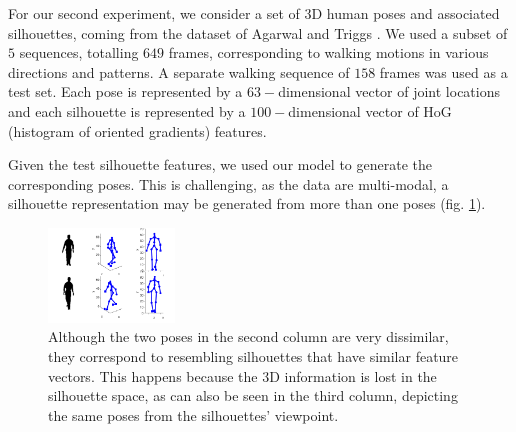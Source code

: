 


For our second experiment, we consider a set of $3$D human poses and
associated silhouettes, coming from the dataset of Agarwal and Triggs
\cite{Agarwal:pose06}. We used a subset of $5$ sequences, totalling
$649$ frames, corresponding to walking motions in various directions
and patterns.  A separate walking sequence of $158$ frames was used as
a test set.  Each pose is represented by a $63-$dimensional vector of
joint locations and each silhouette is represented by a
$100-$dimensional vector of HoG (histogram of oriented gradients) features.

\par Given the test silhouette features, we used our model to generate
the corresponding poses. This is challenging, as the data
are multi-modal, \ie a silhouette representation may be generated from
more than one poses (\eg fig. \ref{fig:humanPoseAmbiguity}).

\begin{figure}[ht]
\begin{center}
  \includegraphics[width=0.3\textwidth]{../diagrams/humanPose/newAmbiguity}
\end{center}
\vspace{-7pt}
\caption{
Although the two poses in the second column are very dissimilar, they correspond to resembling silhouettes
that have similar feature vectors. This happens because the $3$D information is lost in the silhouette space,
as can also be seen in the third column, depicting the same poses from the silhouettes' viewpoint.
}
\label{fig:humanPoseAmbiguity}
\end{figure}

